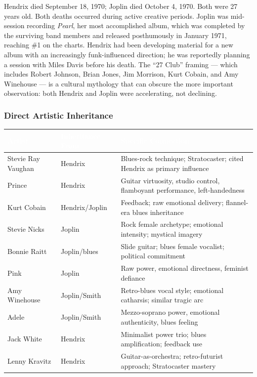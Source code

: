 \documentclass[11pt,letterpaper]{article}
\newcommand{\tableheader}[1]{\textbf{\sffamily\textcolor{white}{#1}}}
\begin{document}
Hendrix died September 18, 1970; Joplin died October 4, 1970. Both were 27 years old. Both deaths occurred during active creative periods. Joplin was mid-session recording \textit{Pearl}, her most accomplished album, which was completed by the surviving band members and released posthumously in January 1971, reaching \#1 on the charts. Hendrix had been developing material for a new album with an increasingly funk-influenced direction; he was reportedly planning a session with Miles Davis before his death. The ``27 Club'' framing --- which includes Robert Johnson, Brian Jones, Jim Morrison, Kurt Cobain, and Amy Winehouse --- is a cultural mythology that can obscure the more important observation: both Hendrix and Joplin were accelerating, not declining.

\subsubsection{Direct Artistic Inheritance}

\begin{center}
\begin{tabularx}{\textwidth}{L{3cm}L{2.5cm}X}
\toprule
{}
\tableheader{Artist} & \tableheader{Inheritance From} & \tableheader{Specific Connection} \\
\midrule
Stevie Ray Vaughan & Hendrix & Blues-rock technique; Stratocaster; cited Hendrix as primary influence \\
Prince & Hendrix & Guitar virtuosity, studio control, flamboyant performance, left-handedness \\
Kurt Cobain & Hendrix/Joplin & Feedback; raw emotional delivery; flannel-era blues inheritance \\
Stevie Nicks & Joplin & Rock female archetype; emotional intensity; mystical imagery \\
Bonnie Raitt & Joplin/blues & Slide guitar; blues female vocalist; political commitment \\
Pink & Joplin & Raw power, emotional directness, feminist defiance \\
Amy Winehouse & Joplin/Smith & Retro-blues vocal style; emotional catharsis; similar tragic arc \\
Adele & Joplin/Smith & Mezzo-soprano power, emotional authenticity, blues feeling \\
Jack White & Hendrix & Minimalist power trio; blues amplification; feedback use \\
Lenny Kravitz & Hendrix & Guitar-as-orchestra; retro-futurist approach; Stratocaster mastery \\
\bottomrule
\end{tabularx}
\end{center}
\end{document}
